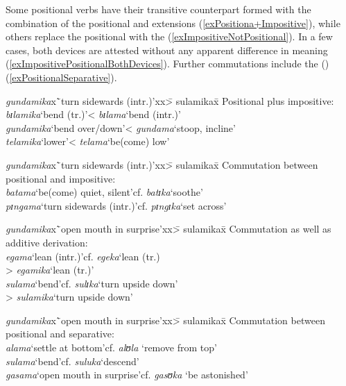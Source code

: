 Some positional verbs have their transitive counterpart formed with the combination of the positional and  extensions (\ref{exPositiona+Impositive}), while others replace the positional with the  (\ref{exImpositiveNotPositional}). In a few cases, both devices are attested without any apparent difference in meaning (\ref{exImpositivePositionalBothDevices}). Further commutations include the  () (\ref{exPositionalSeparative}).
\begin{exe}
\ex \label{exPositiona+Impositive}
\begin{tabbing}
\textit{gundamika}x\=`turn sidewards (intr.)'xx\=> sulamikax\=\kill%
Positional plus impositive:\\
\textit{bɪlamika}\>`bend (tr.)'\>< \textit{bɪlama}\>`bend (intr.)'
\\\textit{gundamika}\>`bend over/down'\>< \textit{gundama}\>`stoop, incline'
\\\textit{telamika}\>`lower'\>< \textit{telama}\>`be(come) low'
\end{tabbing}

\ex\label{exImpositiveNotPositional}
\begin{tabbing}
\textit{gundamika}x\=`turn sidewards (intr.)'xx\=> sulamikax\=\kill%
Commutation between positional and impositive:\\
\textit{batama}\>`be(come) quiet, silent'\>cf. \textit{batɪka}\>`soothe'\\
\textit{pɪngama}\>`turn sidewards (intr.)'\>cf. \textit{pɪngɪka}\>`set across'
\end{tabbing}
\newpage 
\ex\label{exImpositivePositionalBothDevices}
\begin{tabbing}
\textit{gundamika}x\=`open mouth in surprise'xx\=> sulamikax\=\kill%
Commutation as well as additive derivation:\\
\textit{egama}\>`lean (intr.)'\>cf. \textit{egeka}\>`lean (tr.)\\
\>\> > \textit{egamika}\>`lean (tr.)'\\
\textit{sulama}\>`bend'\>cf. \textit{sulɪka}\>`turn upside down'\\ 
\>\> > \textit{sulamika}\>`turn upside down'
\end{tabbing}
\ex \label{exPositionalSeparative}
\begin{tabbing}
\textit{gundamika}x\=`open mouth in surprise'xx\=> sulamikax\=\kill%
Commutation between positional and separative:\\
\textit{alama}\>`settle at bottom'\>cf. \textit{alʊla}\> \lq remove from top'\\
\textit{sulama}\>`bend'\>cf. \textit{suluka}\>`descend'\\
\textit{gasama}\>`open mouth in surprise'\>cf. \textit{gasʊka} \>`be astonished'
\end{tabbing}
\end{exe}
